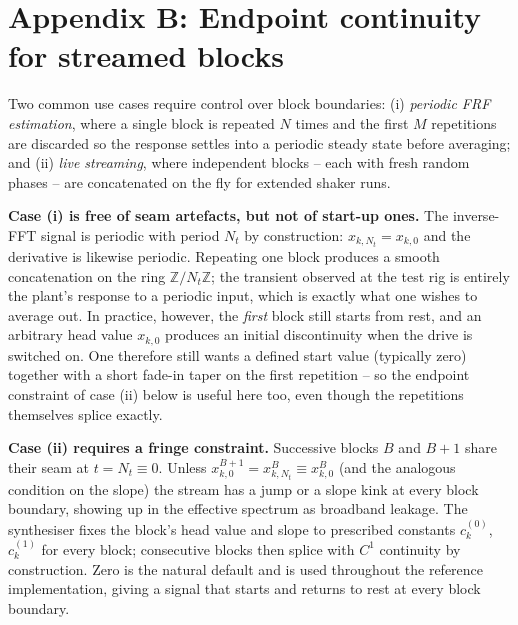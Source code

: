 \documentclass[10pt,a4paper]{article}
\numberwithin{equation}{section}
\begin{document}
\section*{Appendix B: Endpoint continuity for streamed blocks}\label{app:endpoint}

Two common use cases require control over block boundaries: (i) \emph{periodic FRF estimation}, where a single block is repeated $N$ times and the first $M$ repetitions are discarded so the response settles into a periodic steady state before averaging; and (ii) \emph{live streaming}, where independent blocks -- each with fresh random phases -- are concatenated on the fly for extended shaker runs.

\textbf{Case (i) is free of seam artefacts, but not of start-up ones.} The inverse-FFT signal is periodic with period $N_t$ by construction: $x_{k, N_t} = x_{k, 0}$ and the derivative is likewise periodic. Repeating one block produces a smooth concatenation on the ring $\mathbb{Z}/N_t\mathbb{Z}$; the transient observed at the test rig is entirely the plant's response to a periodic input, which is exactly what one wishes to average out. In practice, however, the \emph{first} block still starts from rest, and an arbitrary head value $x_{k,0}$ produces an initial discontinuity when the drive is switched on. One therefore still wants a defined start value (typically zero) together with a short fade-in taper on the first repetition -- so the endpoint constraint of case (ii) below is useful here too, even though the repetitions themselves splice exactly.

\textbf{Case (ii) requires a fringe constraint.} Successive blocks $B$ and $B{+}1$ share their seam at $t=N_t \equiv 0$. Unless $x^{B+1}_{k, 0} = x^{B}_{k, N_t} \equiv x^{B}_{k, 0}$ (and the analogous condition on the slope) the stream has a jump or a slope kink at every block boundary, showing up in the effective spectrum as broadband leakage. The synthesiser fixes the block's head value and slope to prescribed constants $c^{(0)}_k$, $c^{(1)}_k$ for every block; consecutive blocks then splice with $C^1$ continuity by construction. Zero is the natural default and is used throughout the reference implementation, giving a signal that starts and returns to rest at every block boundary.
\end{document}
